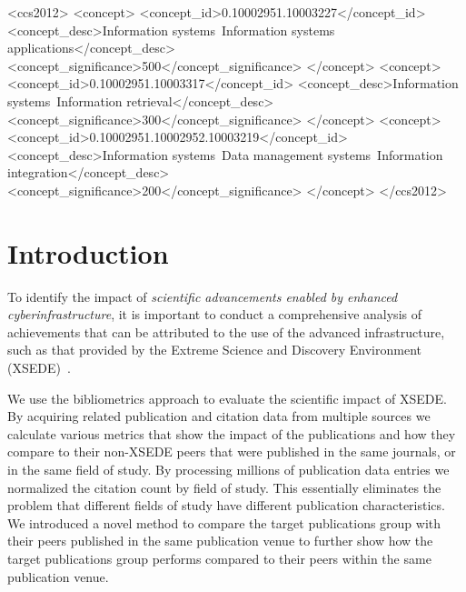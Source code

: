 \documentclass[sigconf]{acmart}
\begin{document}
\begin{CCSXML}
<ccs2012>
 <concept>
  <concept_id>0.10002951.10003227</concept_id>
  <concept_desc>Information systems~Information systems applications</concept_desc>
  <concept_significance>500</concept_significance>
 </concept>
 <concept>
  <concept_id>0.10002951.10003317</concept_id>
  <concept_desc>Information systems~Information retrieval</concept_desc>
  <concept_significance>300</concept_significance>
 </concept>
 <concept>
  <concept_id>0.10002951.10002952.10003219</concept_id>
  <concept_desc>Information systems~Data management systems~Information integration</concept_desc>
  <concept_significance>200</concept_significance>
 </concept>
</ccs2012>
\end{CCSXML}





\maketitle

\section{Introduction} 

To identify the impact of {\em scientific advancements enabled by
  enhanced cyberinfrastructure}, it is important to conduct a
comprehensive analysis of achievements that can be attributed to the
use of the advanced infrastructure, such as that provided by the
Extreme Science and Discovery Environment
(XSEDE)~\cite{www-xsede,xsede}.

We use the bibliometrics approach to evaluate the scientific impact of
XSEDE. By acquiring related publication and citation data from
multiple sources we calculate various metrics that show the impact of
the publications and how they compare to their non-XSEDE peers that
were published in the same journals, or in the same field of study. By
processing millions of publication data entries we normalized the
citation count by field of study. This essentially eliminates the
problem that different fields of study have different publication
characteristics. We introduced a novel \cite{tas2015} method to
compare the target publications group with their peers published in
the same publication venue to further show how the target publications
group performs compared to their peers within the same publication
venue.
\end{document}
